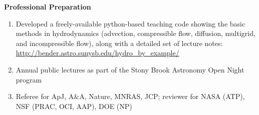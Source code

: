 \documentclass[11pt,letterpaper,english]{article}
\begin{document}
\begin{flushleft} {\bf Professional Preparation}
\begin{enumerate}
\item Developed a freely-available python-based teaching code showing
  the basic methods in hydrodynamics (advection, compressible flow, 
  diffusion, multigrid, and incompressible flow), along with a detailed
  set of lecture notes: \url{http://bender.astro.sunysb.edu/hydro_by_example/} \\ 
\item Annual public lectures as part of the Stony Brook Astronomy Open Night program
 \\
 
\item Referee for ApJ, A\&A, Nature, MNRAS, JCP; reviewer for NASA (ATP), NSF (PRAC, OCI, AAP), DOE (NP) \\ 
\end{enumerate} 


\end{flushleft}
\end{document}
